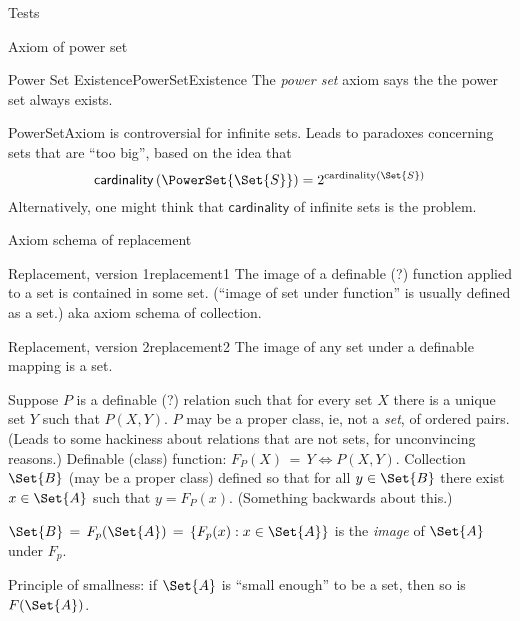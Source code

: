 \documentclass{PalisadesLakesBook}
\begin{document}
\begin{plSection}{Tests}
\begin{plSection}{Axiom of power set}
\begin{plAxiom}{Power Set Existence}{PowerSetExistence}
The \textsl{power set} axiom says the the power set
always exists.~\cite{wiki:AxiomOfPowerSet}
\end{plAxiom}

\begin{plNote}{}{PowerSetAxiom}
 is controversial for infinite sets. 
Leads to paradoxes concerning sets that are ``too big'',
based on the idea that 
\begin{equation}
 \mathsf{cardinality}\left(\PowerSet{\Set{S}}\right)
 = 2^{\text{cardinality}(\Set{S})}
\end{equation}
Alternatively, one might think that $\mathsf{cardinality}$ of
infinite sets is the problem.
\end{plNote}

\end{plSection}%
\begin{plSection}{Axiom schema of replacement}
\label{sec:Axiom-schema-of-replacement}

\begin{plAxiomSchema}{Replacement, version 1}{replacement1}
The image of a definable (?) function applied to a set
is contained in some set.\cite{wiki:AxiomSchemaOfReplacement}
(``image of set under function'' is usually defined as a set.)
aka axiom schema of collection.
\end{plAxiomSchema}%

\begin{plAxiomSchema}{Replacement, version 2}{replacement2}
The image of any set under a definable mapping is a set.

Suppose $P$ is a definable (?) relation such that for every
set $X$ there is a unique set $Y$ such that $P(X,Y)$.
$P$ may be a proper class\cite{wiki:ClassSetTheory}, 
ie, not a \textit{set}, of ordered pairs. 
(Leads to some hackiness about relations that are not sets,
for unconvincing reasons\cite{wiki:BinaryRelation}.)
Definable (class) function: $F_P(X)\,=\,Y \iff P(X,Y)$.
Collection $\Set{B}$ (may be a proper class)
defined so that for all $y\in\Set{B}$ there exist $x \in \Set{A}$
such that $y=F_P(x)$.
(Something backwards about this.)

$\Set{B}\,=\,F_p(\Set{A}) \,=\, \{F_p(x) : x \in \Set{A}\}$ 
is the \textsl{image} of $\Set{A}$ under $F_p$.

Principle of smallness: if $\Set{A}$ is 
``small enough'' to be a set,
then so is $F(\Set{A})$.
\end{plAxiomSchema}%


\end{plSection}
\end{plSection}
\end{document}
